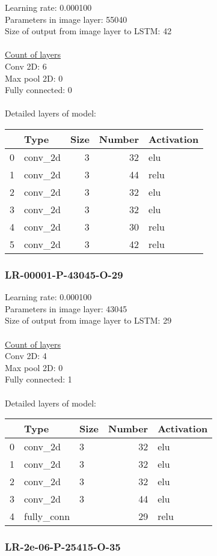 Learning rate: 0.000100
\\Parameters in image layer: 55040
\\Size of output from image layer to LSTM: 42
\\\\\underline{Count of layers} 
\\Conv 2D:           6\\Max pool 2D:      0\\Fully connected:  0
\\\\Detailed layers of model: \\\begin{tabular}{rlrrl}
\hline
    & Type    &   Size &   Number & Activation   \\
\hline
  0 & conv\_2d &      3 &       32 & elu          \\
  1 & conv\_2d &      3 &       44 & relu         \\
  2 & conv\_2d &      3 &       32 & elu          \\
  3 & conv\_2d &      3 &       32 & elu          \\
  4 & conv\_2d &      3 &       30 & relu         \\
  5 & conv\_2d &      3 &       42 & relu         \\
\hline
\end{tabular}\subsubsection*{LR-00001-P-43045-O-29}
Learning rate: 0.000100
\\Parameters in image layer: 43045
\\Size of output from image layer to LSTM: 29
\\\\\underline{Count of layers} 
\\Conv 2D:           4\\Max pool 2D:      0\\Fully connected:  1
\\\\Detailed layers of model: \\\begin{tabular}{rllrl}
\hline
    & Type       & Size   &   Number & Activation   \\
\hline
  0 & conv\_2d    & 3      &       32 & elu          \\
  1 & conv\_2d    & 3      &       32 & elu          \\
  2 & conv\_2d    & 3      &       32 & elu          \\
  3 & conv\_2d    & 3      &       44 & elu          \\
  4 & fully\_conn &        &       29 & relu         \\
\hline
\end{tabular}\subsubsection*{LR-2e-06-P-25415-O-35}
